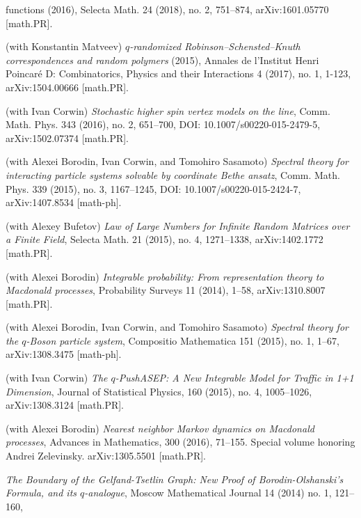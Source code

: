 \documentclass[letterpaper,11pt]{article}
\begin{document}
\begin{etaremune}
{		      functions}
	      (2016),
				Selecta Math. 24 (2018), no. 2, 751--874,
	      arXiv:1601.05770 [math.PR].
	\item
	      (with Konstantin Matveev)
	      \emph{$q$-randomized Robinson--Schensted--Knuth correspondences
		      and random polymers}
	      (2015),
	      Annales de l'Institut Henri Poincar\'e D: Combinatorics, Physics
	      and their Interactions 4 (2017), no. 1, 1-123, arXiv:1504.00666 [math.PR].
	\item
	      (with Ivan Corwin)
	      \emph{Stochastic higher spin vertex models on the line},
	      Comm. Math. Phys. 343 (2016), no. 2, 651--700, DOI:
	      10.1007/s00220-015-2479-5, arXiv:1502.07374 [math.PR].
	\item
	      (with Alexei Borodin, Ivan Corwin, and Tomohiro Sasamoto)
	      \emph{Spectral theory for interacting particle systems solvable
		      by coordinate Bethe ansatz},
	      Comm. Math. Phys. 339 (2015), no. 3, 1167--1245, DOI:
	      10.1007/s00220-015-2424-7, arXiv:1407.8534 [math-ph].
	\item
	      (with Alexey Bufetov)
	      \emph{Law of Large Numbers for Infinite Random Matrices over a
		      Finite Field},
	      Selecta Math. 21 (2015), no. 4, 1271--1338, arXiv:1402.1772
	      [math.PR].
	\item
	      (with Alexei Borodin)
	      \emph{Integrable probability: From representation theory to
		      Macdonald processes},
	      Probability Surveys 11 (2014), 1--58, arXiv:1310.8007 [math.PR].
	\item
	      (with Alexei Borodin, Ivan Corwin, and Tomohiro Sasamoto)
	      \emph{Spectral theory for the $q$-Boson particle system},
	      Compositio Mathematica 151 (2015), no. 1, 1--67, arXiv:1308.3475
	      [math-ph].
	\item
	      (with Ivan Corwin)
	      \emph{The $q$-PushASEP: A New Integrable Model for Traffic in
		      1+1 Dimension},
	      Journal of Statistical Physics, 160 (2015), no. 4, 1005--1026,
	      arXiv:1308.3124 [math.PR].
	\item
	      (with Alexei Borodin)
	      \emph{Nearest neighbor Markov dynamics on Macdonald processes},
	      Advances in Mathematics, 300 (2016), 71--155. Special volume
	      honoring Andrei Zelevinsky. arXiv:1305.5501 [math.PR].
	\item
	      \emph{The Boundary of the Gelfand-Tsetlin Graph: New Proof of
		      Borodin-Olshanski's Formula, and its $q$-analogue},
	      Moscow Mathematical Journal 14 (2014) no. 1, 121--160,

\end{etaremune}
\end{document}
